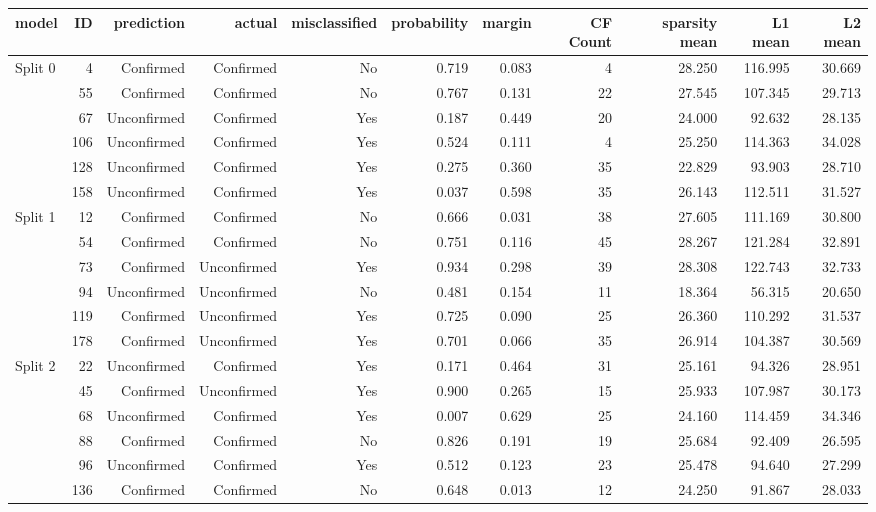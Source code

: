 \documentclass[fleqn,10pt]{wlscirep}
\begin{document}
\begin{table}[h]
\centering
\footnotesize
\begin{tabular}{lrrrrrrrrrr}
\toprule
model & ID & prediction & actual & misclassified & probability & margin & CF Count & sparsity mean & L1 mean & L2 mean \\
\midrule
Split 0 & 4 & Confirmed & Confirmed & No & 0.719 & 0.083 & 4 & 28.250 & 116.995 & 30.669 \\
 & 55 & Confirmed & Confirmed & No & 0.767 & 0.131 & 22 & 27.545 & 107.345 & 29.713 \\
 & 67 & Unconfirmed & Confirmed & Yes & 0.187 & 0.449 & 20 & 24.000 & 92.632 & 28.135 \\
 & 106 & Unconfirmed & Confirmed & Yes & 0.524 & 0.111 & 4 & 25.250 & 114.363 & 34.028 \\
 & 128 & Unconfirmed & Confirmed & Yes & 0.275 & 0.360 & 35 & 22.829 & 93.903 & 28.710 \\
 & 158 & Unconfirmed & Confirmed & Yes & 0.037 & 0.598 & 35 & 26.143 & 112.511 & 31.527 \\
\midrule
Split 1 & 12 & Confirmed & Confirmed & No & 0.666 & 0.031 & 38 & 27.605 & 111.169 & 30.800 \\
 & 54 & Confirmed & Confirmed & No & 0.751 & 0.116 & 45 & 28.267 & 121.284 & 32.891 \\
 & 73 & Confirmed & Unconfirmed & Yes & 0.934 & 0.298 & 39 & 28.308 & 122.743 & 32.733 \\
 & 94 & Unconfirmed & Unconfirmed & No & 0.481 & 0.154 & 11 & 18.364 & 56.315 & 20.650 \\
 & 119 & Confirmed & Unconfirmed & Yes & 0.725 & 0.090 & 25 & 26.360 & 110.292 & 31.537 \\
 & 178 & Confirmed & Unconfirmed & Yes & 0.701 & 0.066 & 35 & 26.914 & 104.387 & 30.569 \\
\midrule
Split 2 & 22 & Unconfirmed & Confirmed & Yes & 0.171 & 0.464 & 31 & 25.161 & 94.326 & 28.951 \\
 & 45 & Confirmed & Unconfirmed & Yes & 0.900 & 0.265 & 15 & 25.933 & 107.987 & 30.173 \\
 & 68 & Unconfirmed & Confirmed & Yes & 0.007 & 0.629 & 25 & 24.160 & 114.459 & 34.346 \\
 & 88 & Confirmed & Confirmed & No & 0.826 & 0.191 & 19 & 25.684 & 92.409 & 26.595 \\
 & 96 & Unconfirmed & Confirmed & Yes & 0.512 & 0.123 & 23 & 25.478 & 94.640 & 27.299 \\
 & 136 & Confirmed & Confirmed & No & 0.648 & 0.013 & 12 & 24.250 & 91.867 & 28.033 \\

\end{tabular}
\end{table}
\end{document}
